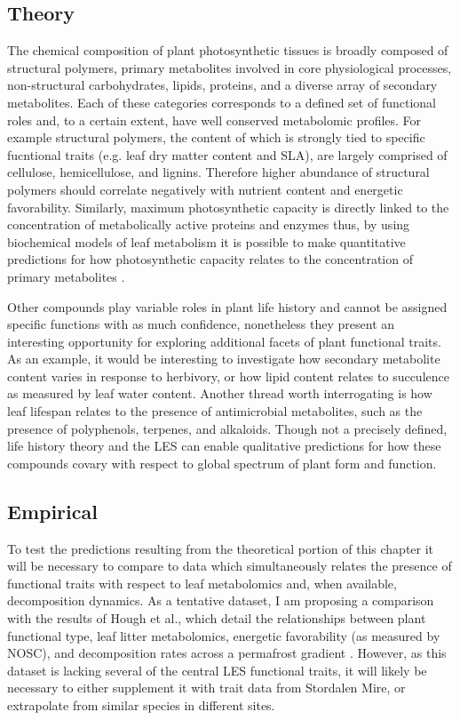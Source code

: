 
\subsection{Theory}

The chemical composition of plant photosynthetic tissues is broadly composed of structural polymers, primary metabolites involved in core physiological processes, non-structural carbohydrates, lipids, proteins, and a diverse array of secondary metabolites. Each of these categories corresponds to a defined set of functional roles and, to a certain extent, have well conserved metabolomic profiles. For example structural polymers, the content of which is strongly tied to specific fucntional traits (e.g. leaf dry matter content and SLA), are largely comprised of cellulose, hemicellulose, and lignins. Therefore higher abundance of structural polymers should correlate negatively with nutrient content and energetic favorability. Similarly, maximum photosynthetic capacity is directly linked to the concentration of metabolically active proteins and enzymes thus, by using biochemical models of leaf metabolism it is possible to make quantitative predictions for how photosynthetic capacity relates to the concentration of primary metabolites \cite{vipina_modelling_2025, paul_carbon_2003}. 

Other compounds play variable roles in plant life history and cannot be assigned specific functions with as much confidence, nonetheless they present an interesting opportunity for exploring additional facets of plant functional traits. As an example, it would be interesting to investigate how secondary metabolite content varies in response to herbivory, or how lipid content relates to succulence as measured by leaf water content. Another thread worth interrogating is how leaf lifespan relates to the presence of antimicrobial metabolites, such as the presence of polyphenols, terpenes, and alkaloids. Though not a precisely defined, life history theory and the LES can enable qualitative predictions for how these compounds covary with respect to global spectrum of plant form and function.

 \subsection{Empirical}

 To test the predictions resulting from the theoretical portion of this chapter it will be necessary to compare to data which simultaneously relates the presence of functional traits with respect to leaf metabolomics and, when available, decomposition dynamics. As a tentative dataset, I am proposing a comparison with the results of Hough et al., which detail the relationships between plant functional type, leaf litter metabolomics, energetic favorability (as measured by NOSC), and decomposition rates across a permafrost gradient \cite{hough2022a}. However, as this dataset is lacking several of the central LES functional traits, it will likely be necessary to either supplement it with trait data from Stordalen Mire, or extrapolate from similar species in different sites.